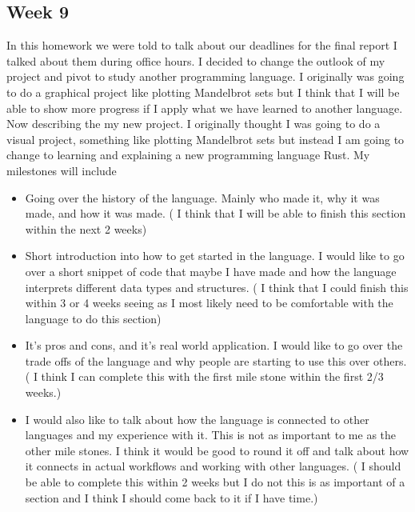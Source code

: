 \documentclass{article}
\theoremstyle{theorem}
\theoremstyle{definition}
\theoremstyle{remark}
\begin{document}
\subsection{Week 9}
  In this homework we were told to talk about our deadlines for the final report I talked about them during office hours.
     I decided to change the outlook of my project and pivot to study another programming language. I originally was going to do a graphical project like plotting Mandelbrot sets but I think that I will be able to show more progress if I apply what we have learned to another language. 
    Now describing the my new project. I originally thought I was going to do a visual project, something like plotting Mandelbrot sets but instead I am going to change to learning and explaining a new programming language Rust. My milestones will include 
    \begin{itemize}

\item Going over the history of the language. Mainly who made it, why it was made, and how it was made. ( I think that I will be able to finish this section within the next 2 weeks) 
\item Short introduction into how to get started in the language. I would like to go over a short snippet of code that maybe I have made and how the language interprets different data types and structures. ( I think that I could finish this within 3 or 4 weeks seeing as I most likely need to be comfortable with the language to do this section)
\item It’s pros and cons, and it's real world application. I would like to go over the trade offs of the language and why people are starting to use this over others. ( I think I can complete this with the first mile stone within the first 2/3 weeks.)
\item I would also like to talk about how the language is connected to other languages and my experience with it. This is not as important to me as the other mile stones. I think it would be good to round it off and talk about how it connects in actual workflows and working with other languages. ( I should be able to complete this within 2 weeks but I do not this is as important of a section and I think I should come back to it if I have time.)
\end{itemize}
\end{document}
